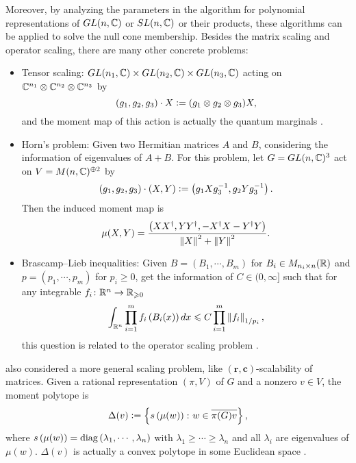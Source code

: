 \documentclass[suri,pdfbookmark]{engsuribt} %
\begin{document}
  Moreover, by analyzing the parameters in the algorithm for polynomial representations of $GL(n,\mathbb{C})$ or $SL(n,\mathbb{C})$ or their products, these algorithms can be applied to solve the null cone membership. Besides the matrix scaling and operator scaling, there are many other concrete problems:
  \begin{itemize}
    \item Tensor scaling: $GL(n_1,\mathbb{C})\times GL(n_2,\mathbb{C})\times GL(n_3,\mathbb{C})$ acting on $\mathbb{C}^{n_1}\otimes\mathbb{C}^{n_2}\otimes\mathbb{C}^{n_3}$ by
    \begin{equation*}
      (g_1,g_2,g_3) \cdot X \vcentcolon= (g_1\otimes g_2 \otimes g_3)X,
    \end{equation*}
    and the moment map of this action is actually the quantum marginals \cite{key21}.

    \item Horn's problem: Given two Hermitian matrices $A$ and $B$, considering the information of eigenvalues of $A+B$. For this problem, let $G = GL(n,\mathbb{C})^3$ act on $V = M(n,\mathbb{C})^{\oplus 2}$ by
    \begin{equation*}
      (g_1,g_2,g_3) \cdot (X,Y) \vcentcolon= \left(g_1Xg_3^{-1},g_2Yg_3^{-1}\right).
    \end{equation*}
    Then the induced moment map is
    \begin{equation*}
      \mu(X,Y) = \frac{\left(XX^\dagger,YY^\dagger,-X^\dagger X-Y^\dagger Y\right)}{\left\lVert X\right\lVert^2+\left\lVert Y\right\lVert^2}.
    \end{equation*}

    \item Brascamp–Lieb inequalities: Given $B=(B_1,\cdots,B_m)$ for $B_i \in M_{n_i \times n}(\mathbb{R})$ and $p=(p_1,\cdots,p_m)$ for $p_i \geqslant 0$, get the information of $C \in (0,\infty]$ such that for any integrable $f_i \colon \mathbb{R}^{n} \rightarrow \mathbb{R}_{\geqslant 0}$
    \begin{equation*}
      \int_{\mathbb{R}^n} \prod_{i=1}^mf_i\left(B_i(x)\right) dx \leqslant C \prod_{i=1}^m \left\lVert f_i\right\lVert_{1/p_i},
    \end{equation*}
    this question is related to the operator scaling problem \cite{key22}.
  \end{itemize}

  \cite{key8} also considered a more general scaling problem, like $(\mathbf{r},\mathbf{c})$-scalability of matrices. Given a rational representation $(\pi,V)$ of $G$ and a nonzero $v \in V$, the moment polytope is 
  \begin{equation*}
    \Delta(v) \vcentcolon= \left\{s\left(\mu(w)\right) \colon w \in \overline{\pi(G)v}\right\},
  \end{equation*}
  where $s\left(\mu(w)\right) = \operatorname{diag}\left(\lambda_1,\cdots,\lambda_n\right)$ with $\lambda_1 \geqslant \cdots \geqslant\lambda_n$ and all $\lambda_i$ are eigenvalues of $\mu(w)$. $\Delta(v)$ is actually a convex polytope in some Euclidean space \cite{key23}.
\end{document}

